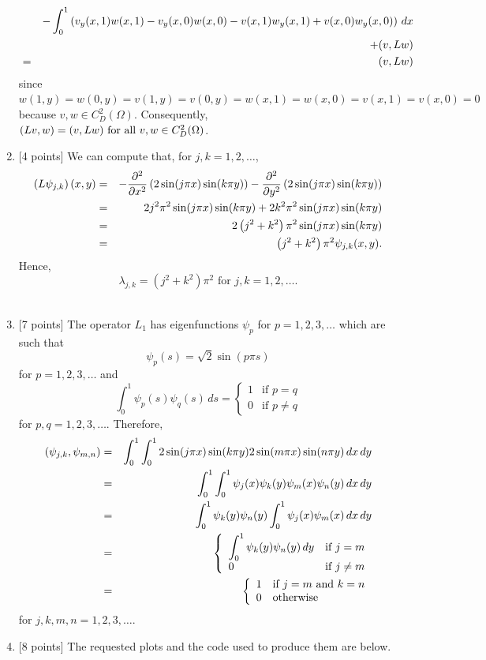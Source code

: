 \begin{solution}
\begin{enumerate}
\begin{eqnarray*}
\\
&&-\int_0^1 \left(v_y(x,1)w(x,1)-v_y(x,0)w(x,0)-v(x,1)w_y(x,1)+v(x,0)w_y(x,0)\right)\,dx
\\
&&+(v,Lw)
\\
&=& (v,Lw)
\end{eqnarray*}
since $w(1,y)=w(0,y)=v(1,y)=v(0,y)=w(x,1)=w(x,0)=v(x,1)=v(x,0)=0$ because $v,w\in C^2_D(\Omega)$. Consequently, $(Lv,w)=(v,Lw)\mbox{ for all }v,w\in C^2_D(\Omega)$.
\\
\item {[4 points]} We can compute that, for $j,k=1,2,\ldots$,
\begin{eqnarray*}
\left(L \psi_{j,k}\right)(x,y) &=& -{\partial^2 \over \partial x^2} \left(2\sin(j\pi x)\sin(k\pi y)\right)-{\partial^2 \over \partial y^2} \left(2\sin(j\pi x)\sin(k\pi y)\right)
\\
&=& 2j^2\pi^2 \sin(j\pi x)\sin(k\pi y)+2k^2 \pi^2 \sin(j\pi x)\sin(k\pi y)
\\
&=& 2\left(j^2 + k^2\right)\pi^2 \sin(j\pi x)\sin(k\pi y)
\\
&=& \left(j^2 + k^2\right)\pi^2\psi_{j,k}(x,y).
\end{eqnarray*}
Hence,
\[
\lambda_{j,k}=(j^2+k^2)\pi^2\mbox{ for }j,k=1,2,\ldots.
\]
\\
\item {[7 points]} The operator $L_1$ has eigenfunctions $\psi_p$ for $p=1,2,3,\ldots$ which are such that
\[
\psi_p(s)=\sqrt{2}\sin(p\pi s)
\]
for $p=1,2,3,\ldots$ and
\[
 \int_0^1 \psi_p(s)\psi_q(s)\, ds=\left\{\begin{array}{ll} 1 & \mbox{if }p=q \\ 0 & \mbox{if }p\ne q \end{array}\right.
\]
for $p,q=1,2,3,\ldots$. Therefore,
\begin{eqnarray*}
(\psi_{j,k}, \psi_{m,n}) &=& \int_0^1 \int_0^1 2\sin(j\pi x) \sin(k\pi y) 2\sin(m\pi x) \sin(n\pi y)\,dx\,dy
\\
&=& \int_0^1 \int_0^1 \psi_j(x) \psi_k(y) \psi_m(x) \psi_n(y) \,dx\,dy
\\
&=& \int_0^1 \psi_k(y) \psi_n(y) \int_0^1 \psi_j(x) \psi_m(x) \,dx\,dy
\\
&=& \left\{\begin{array}{ll} \displaystyle{\int_0^1 \psi_k(y) \psi_n(y) \,dy} & \mbox{if }j=m \\ \displaystyle{0} & \mbox{if }j\ne m \end{array}\right.
\\
&=& \left\{\begin{array}{ll} 1 & \mbox{if }j=m\mbox{ and }k=n \\ 0 & \mbox{otherwise} \end{array}\right.
\end{eqnarray*}
for $j,k,m,n=1,2,3,\ldots$.
\\
\item {[8 points]} The requested plots and the code used to produce them are below.


\end{enumerate}
\end{solution}
